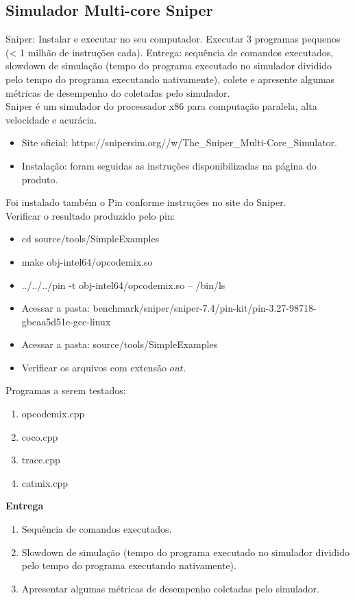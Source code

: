 
\subsection{Simulador Multi-core Sniper}

Sniper: Instalar e executar no seu computador. Executar 3 programas pequenos (< 1 milhão de instruções cada). Entrega: sequência de comandos executados, slowdown de simulação (tempo do programa executado no simulador dividido pelo tempo do programa executando nativamente), colete e apresente algumas métricas de desempenho do coletadas pelo simulador. \\

Sniper é um simulador do processador x86 para computação paralela, alta velocidade e acurácia.

\begin{itemize}
    \item Site oficial: https://snipersim.org//w/The\_Sniper\_Multi-Core\_Simulator.
    \item Instalação: foram seguidas as instruções disponibilizadas na página do produto.
\end{itemize}

Foi instalado também o Pin conforme instruções no site do Sniper. \\


Verificar o resultado produzido pelo pin:

\begin{itemize}
    \item cd source/tools/SimpleExamples
    \item make obj-intel64/opcodemix.so
    \item ../../../pin -t obj-intel64/opcodemix.so -- /bin/ls
    \item Acessar a pasta: benchmark/sniper/sniper-7.4/pin-kit/pin-3.27-98718-gbeaa5d51e-gcc-linux
    \item Acessar a pasta: source/tools/SimpleExamples
    \item Verificar os arquivos com extensão $out$.
\end{itemize}


Programas a serem testados:

\begin{enumerate}
    \item opcodemix.cpp
    \item coco.cpp 
    \item trace.cpp
    \item catmix.cpp 
\end{enumerate}


\textbf{Entrega}

\begin{enumerate}
    \item Sequência de comandos executados.
    \item Slowdown de simulação (tempo do programa executado no simulador dividido pelo tempo do programa executando nativamente).
    \item Apresentar algumas métricas de desempenho coletadas pelo simulador.
\end{enumerate}

